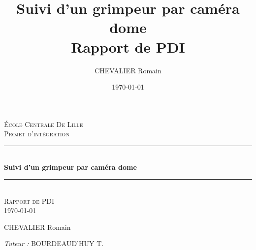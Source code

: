 \documentclass[a4paper, 11pt, french]{article}
\title{%
        \Huge Suivi d'un grimpeur par caméra dome \\
        \LARGE Rapport de PDI}
\author{\LARGE CHEVALIER Romain}
\date{\today}
\newcommand{\HRule}{\rule{\linewidth}{0.5mm}}
\begin{document}
\begin{titlepage}

    \begin{titlepage}
        \begin{center}
      
      
          \textsc{\LARGE École Centrale De Lille}\\[2cm]
      
          \textsc{\huge Projet d'intégration}\\[2cm]
      
          \HRule \\[0.4cm]
          { \Huge \bfseries Suivi d'un grimpeur par caméra dome\\[0.4cm] }
      
          \HRule \\[2cm]

          \textsc{\Large Rapport de PDI \\} {\large\today}\\[1.5cm]
          
          \vfill
          \vfill
 
          \begin{minipage}{0.4\textwidth}
            \begin{flushleft} \large
              CHEVALIER Romain\\
            \end{flushleft}
          \end{minipage}
          \begin{minipage}{0.4\textwidth}
            \begin{flushright} \large
              \emph{Tuteur :}  BOURDEAUD'HUY T. \\
            \end{flushright}
          \end{minipage}
      
          \vspace{1cm}
         
        \end{center}
      \end{titlepage}
    
    \normalsize
   
\end{titlepage}
\end{document}
